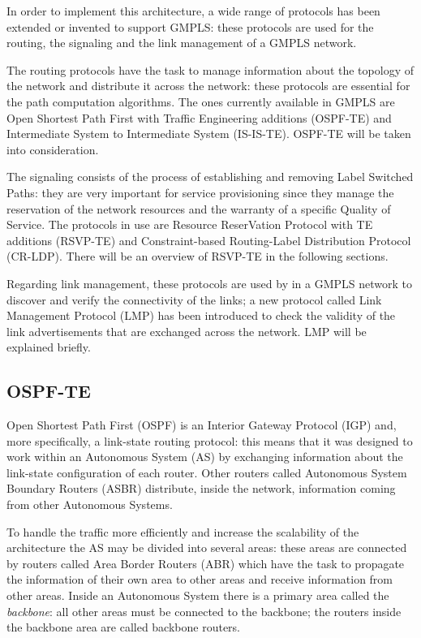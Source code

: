 \documentclass[10pt,a4paper]{report}
\begin{document}
In order to implement this architecture, a wide range of protocols has
been extended or invented to support GMPLS: these protocols are used
for the routing, the signaling and the link management of a GMPLS
network.

The routing protocols have the task to manage information about the
topology of the network and distribute it across the network: these
protocols are essential for the path computation algorithms. The ones
currently available in GMPLS are Open Shortest Path First with Traffic
Engineering additions (OSPF-TE) and Intermediate System to
Intermediate System (IS-IS-TE). OSPF-TE will be taken into consideration.

The signaling consists of the process of establishing and removing
Label Switched Paths: they are very important for service provisioning
since they manage the reservation of the network resources and the
warranty of a specific Quality of Service. The protocols in use are
Resource ReserVation Protocol with TE additions (RSVP-TE) and
Constraint-based Routing-Label Distribution Protocol (CR-LDP). There
will be an overview of RSVP-TE in the following sections.

\newpage

Regarding link management, these protocols are used by in a GMPLS
network to discover and verify the connectivity of the links; a new
protocol called Link Management Protocol (LMP) has been introduced to
check the validity of the link advertisements that are exchanged
across the network. LMP will be explained briefly.

\subsection{OSPF-TE}

Open Shortest Path First (OSPF) is an Interior Gateway Protocol (IGP)
and, more specifically, a link-state routing protocol: this means that
it was designed to work within an Autonomous System (AS) by exchanging
information about the link-state configuration of each router. Other
routers called Autonomous System Boundary Routers (ASBR) distribute,
inside the network, information coming from other Autonomous Systems.

To handle the traffic more efficiently and increase the scalability of
the architecture the AS may be divided into several areas: these areas
are connected by routers called Area Border Routers (ABR) which have
the task to propagate the information of their own area to other areas
and receive information from other areas. Inside an Autonomous System
there is a primary area called the \textit{backbone}: all other areas
must be connected to the backbone; the routers inside the backbone
area are called backbone routers.
\end{document}
